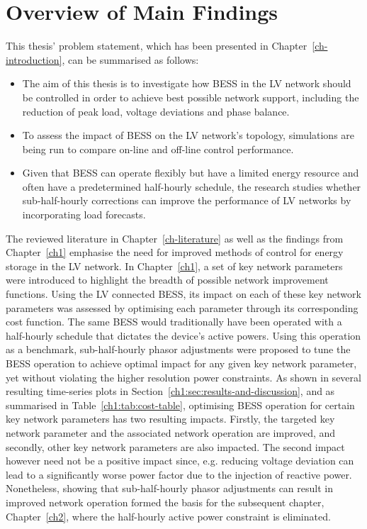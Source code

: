 \section{Overview of Main Findings}
\label{ch-conclusion:main-findings}

This thesis' problem statement, which has been presented in Chapter~\ref{ch-introduction}, can be summarised as follows:

\begin{itemize}
	\item
	The aim of this thesis is to investigate how BESS in the LV network should be controlled in order to achieve best possible network support, including the reduction of peak load, voltage deviations and phase balance.
	\item 
	To assess the impact of BESS on the LV network's topology, simulations are being run to compare on-line and off-line control performance.
	\item
	Given that BESS can operate flexibly but have a limited energy resource and often have a predetermined half-hourly schedule, the research studies whether sub-half-hourly corrections can improve the performance of LV networks by incorporating load forecasts.
\end{itemize}

The reviewed literature in Chapter~\ref{ch-literature} as well as the findings from Chapter~\ref{ch1} emphasise the need for improved methods of control for energy storage in the LV network.
In Chapter~\ref{ch1}, a set of key network parameters were introduced to highlight the breadth of possible network improvement functions.
Using the LV connected BESS, its impact on each of these key network parameters was assessed by optimising each parameter through its corresponding cost function.
The same BESS would traditionally have been operated with a half-hourly schedule that dictates the device's active powers.
Using this operation as a benchmark, sub-half-hourly phasor adjustments were proposed to tune the BESS operation to achieve optimal impact for any given key network parameter, yet without violating the higher resolution power constraints.
As shown in several resulting time-series plots in Section~\ref{ch1:sec:results-and-discussion}, and as summarised in Table~\ref{ch1:tab:cost-table}, optimising BESS operation for certain key network parameters has two resulting impacts.
Firstly, the targeted key network parameter and the associated network operation are improved, and secondly, other key network parameters are also impacted.
The second impact however need not be a positive impact since, e.g. reducing voltage deviation can lead to a significantly worse power factor due to the injection of reactive power.
Nonetheless, showing that sub-half-hourly phasor adjustments can result in improved network operation formed the basis for the subsequent chapter, Chapter~\ref{ch2}, where the half-hourly active power constraint is  eliminated.

